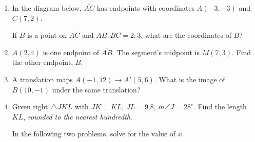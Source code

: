 \documentclass[12pt, twoside]{article}
\begin{document}
\begin{enumerate}
\newpage

  \item In the diagram below, $\overline{AC}$ has endpoints with coordinates $A(-3,-3)$ and $C(7, 2)$.
    \begin{center} %
    \end{center}
    If $B$ is a point on $\overline{AC}$ and $AB {:} BC = 2{:}3$,  what  are  the coordinates of $B$? \vspace{4cm}

  \item $A(2,4)$ is one endpoint of $\overline{AB}$. The segment's midpoint is $M(7,3)$. Find the other endpoint, $B$. \vspace{3cm}

  \item A translation maps $A(-1,12) \rightarrow A'(5,6)$. What is the image of $B(10,-1)$ under the same translation?  \vspace{3cm}

\newpage

  \item Given right $\triangle JKL$ with $\overline{JK} \perp \overline{KL}$, $JL=9.8$, $m\angle J=28^\circ$. Find the length $KL$, \emph{rounded to the nearest hundredth}.
    \begin{center}
    \end{center}
\vspace{1cm}

  In the following two problems, solve for the value of $x$.


\end{enumerate}
\end{document}
